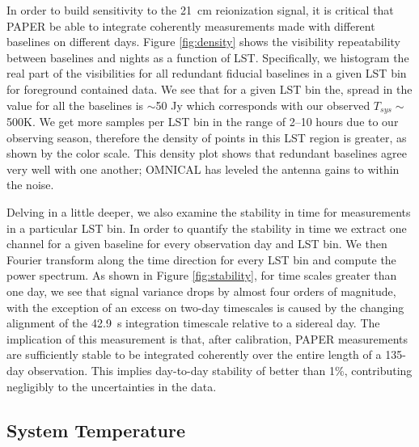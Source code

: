 \documentclass[twocolumn,numberedappendix]{emulateapj} \shorttitle{New Limits on the 21 cm Power Spectrum at $z=8.4$}
\begin{document}
In order to build sensitivity to the 21~cm reionization signal, it is critical
that PAPER be able to integrate coherently measurements made with different baselines on different days.
Figure \ref{fig:density} shows the visibility repeatability between 
baselines and nights as a function of LST. Specifically, we histogram the real part of
the visibilities for all redundant fiducial baselines 
in a given LST bin for foreground contained data. We see that for a
given LST bin the, spread in the value for all the baselines is $\sim$50 Jy which corresponds with our observed
$T_{sys}\sim$500K.  We get
more samples per LST bin in the range of 2--10 hours due to our observing
season, therefore the density of points in this LST region is greater, as shown by
the color scale. This density plot shows that redundant baselines agree very well
with one another; OMNICAL has leveled the antenna gains to within the noise.

Delving in a little deeper, we also examine the
stability in time for measurements in a particular LST bin. In order to quantify the stability
in time we extract one channel for a given baseline for every observation day
and LST bin. We then Fourier transform along the time direction for every LST
bin and compute the power spectrum. As shown in Figure \ref{fig:stability},
for time scales greater than one day, we see that signal variance drops by
almost four orders of magnitude, 
with the exception of an 
excess on two-day timescales is caused by the changing alignment of the 42.9~s
integration timescale relative to a sidereal day.  The implication of this
measurement is that, after calibration, PAPER measurements are sufficiently
stable to be integrated coherently over the entire length of a 135-day
observation. This implies day-to-day stability of better than 1\%, contributing
negligibly to the uncertainties in the data.

\subsection{System Temperature}   
\end{document}
